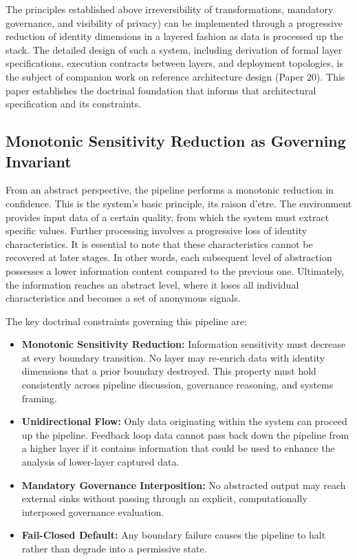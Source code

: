 \documentclass[conference]{IEEEtran}
\begin{document}
The principles established above irreversibility of transformations, mandatory governance, and visibility of privacy) can be implemented through a progressive reduction of identity dimensions in a layered fashion as data is processed up the stack. The detailed design of such a system, including derivation of formal layer specifications, execution contracts between layers, and deployment topologies, is the subject of companion work on reference architecture design (Paper 20). This paper establishes the doctrinal foundation that informs that architectural specification and its constraints.

\subsection{Monotonic Sensitivity Reduction as Governing Invariant}
From an abstract perspective, the pipeline performs a monotonic reduction in confidence. This is the system’s basic principle, its raison d’etre. The environment provides input data of a certain quality, from which the system must extract specific values. Further processing involves a progressive loss of identity characteristics. It is essential to note that these characteristics cannot be recovered at later stages. In other words, each subsequent level of abstraction possesses a lower information content compared to the previous one. Ultimately, the information reaches an abstract level, where it loses all individual characteristics and becomes a set of anonymous signals.

The key doctrinal constraints governing this pipeline are:

\begin{itemize}
    \item \textbf{Monotonic Sensitivity Reduction:} Information sensitivity must decrease at every boundary transition. No layer may re-enrich data with identity dimensions that a prior boundary destroyed. This property must hold consistently across pipeline discussion, governance reasoning, and systems framing.
    \item \textbf{Unidirectional Flow:} Only data originating within the system can proceed up the pipeline. Feedback loop data cannot pass back down the pipeline from a higher layer if it contains information that could be used to enhance the analysis of lower-layer captured data.
    \item \textbf{Mandatory Governance Interposition:} No abstracted output may reach external sinks without passing through an explicit, computationally interposed governance evaluation.
    \item \textbf{Fail-Closed Default:} Any boundary failure causes the pipeline to halt rather than degrade into a permissive state.
\end{itemize}
\end{document}
